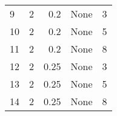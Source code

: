 \begin{tabular}{lrrlr}
9                                        &                                        2 &                                      0.2 &                                     None &                                        3 \\
10                                       &                                        2 &                                      0.2 &                                     None &                                        5 \\
11                                       &                                        2 &                                      0.2 &                                     None &                                        8 \\
12                                       &                                        2 &                                     0.25 &                                     None &                                        3 \\
13                                       &                                        2 &                                     0.25 &                                     None &                                        5 \\
14                                       &                                        2 &                                     0.25 &                                     None &                                        8 \\
\hline
\end{tabular}
